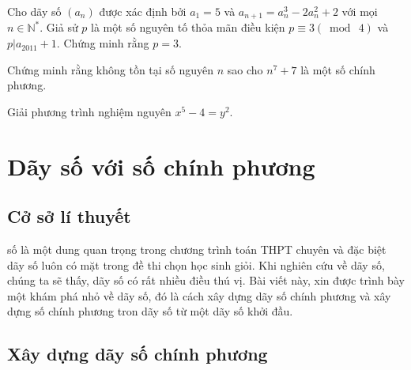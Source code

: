 \begin{bt}%
	Cho dãy số $(a_n)$ được xác định bởi $a_1 = 5$ và $a_{n + 1}= a_n^3 - 2a_n^2 + 2$ với mọi $n\in \mathbb{N}^*$. Giả sử $p$ là một số nguyên tố thỏa mãn điều kiện $p \equiv 3 (\bmod \ 4)$ và $p\left| {{a_{2011}} + 1} \right.$. Chứng minh rằng $p=3$.
\end{bt}
\begin{bt}%
	Chứng minh rằng không tồn tại số nguyên $n$ sao cho $n^7+7$ là một số chính phương.
\end{bt}
\begin{bt}[Balkan MO, 1998]%
	Giải phương trình nghiệm nguyên $x^5-4=y^2$. 
\end{bt}


\section{Dãy số với số chính phương}
\begin{center}
	\textbf{\color{violet}{Võ Thị Vân\\
			(GV THPT Chuyên Bắc Giang)}}
\end{center}
\subsection{Cở sở lí thuyết}
 số là một dung quan trọng trong chương trình toán THPT chuyên và đặc biệt dãy số luôn có mặt trong đề thi chọn học sinh giỏi. Khi nghiên cứu về dãy số, chúng ta sẽ thấy, dãy số có rất nhiều điều thú vị. Bài viết này, xin được trình bày một khám phá nhỏ về dãy số, đó là cách xây dựng dãy số chính phương và xây dựng số chính phương tron dãy số từ một dãy số khởi đầu.
\subsection{Xây dựng dãy số chính phương}

